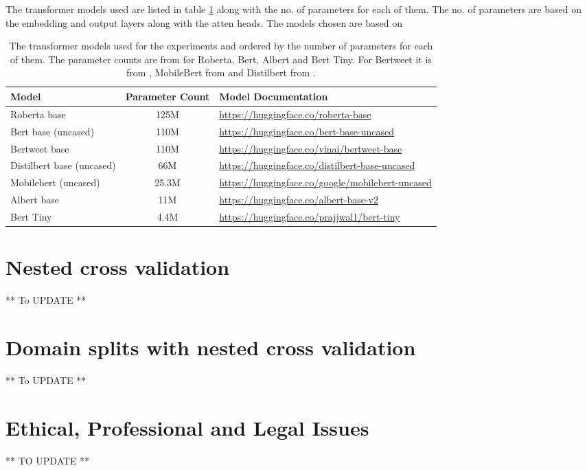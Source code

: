 The transformer models used are listed in table \ref{tab: model_dtls} along with the no. of parameters for each of them. The no. of parameters are based on the embedding and output layers along with the atten heads. The models chosen are based on 

\begin{table}[ht]
    \captionsetup{font=small}
    \centering
    \begin{tabularx}{\textwidth}{|l|c|X|}
        \hline
        \rowcolor[gray]{0.7}
        \textbf{Model} & \textbf{Parameter Count} & \textbf{Model Documentation} \\
        \hline
        Roberta base & 125M & \small{\url{https://huggingface.co/roberta-base}} \\
        \hline 
        Bert base (uncased) & 110M & \small{\url{https://huggingface.co/bert-base-uncased}} \\
        \hline
        Bertweet base & 110M & \small{\url{https://huggingface.co/vinai/bertweet-base}} \\
        \hline
        Distilbert base (uncased) & 66M & \small{\url{https://huggingface.co/distilbert-base-uncased}} \\
        \hline
        Mobilebert (uncased) & 25.3M & \small{\url{https://huggingface.co/google/mobilebert-uncased}} \\
        \hline
        Albert base & 11M & \small{\url{https://huggingface.co/albert-base-v2}} \\
        \hline
        Bert Tiny & 4.4M & \small{\url{https://huggingface.co/prajjwal1/bert-tiny}} \\
        \hline
    \end{tabularx}
    \caption{The transformer models used for the experiments and ordered by the number of parameters for each of them. The parameter counts are from \cite{bhargavaGeneralizationNLIWays2021} for Roberta, Bert, Albert and Bert Tiny. For Bertweet it is from \cite{nguyenBERTweetPretrainedLanguage2020}, MobileBert from \cite{sunMobileBERTCompactTaskAgnostic2020} and Distilbert from \cite{sanhDistilBERTDistilledVersion2020}.}    
    \label{tab: model_dtls}
\end{table} 


\section{Nested cross validation}
** To UPDATE **

\section{Domain splits with nested cross validation}
** To UPDATE **

\section{Ethical, Professional and Legal Issues}
** TO UPDATE **
